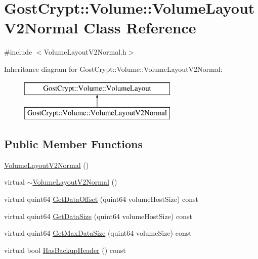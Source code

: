 \hypertarget{class_gost_crypt_1_1_volume_1_1_volume_layout_v2_normal}{}\section{Gost\+Crypt\+:\+:Volume\+:\+:Volume\+Layout\+V2\+Normal Class Reference}
\label{class_gost_crypt_1_1_volume_1_1_volume_layout_v2_normal}


{\ttfamily \#include $<$Volume\+Layout\+V2\+Normal.\+h$>$}

Inheritance diagram for Gost\+Crypt\+:\+:Volume\+:\+:Volume\+Layout\+V2\+Normal\+:\begin{figure}[H]
\begin{center}
\leavevmode
\includegraphics[height=2.000000cm]{class_gost_crypt_1_1_volume_1_1_volume_layout_v2_normal}
\end{center}
\end{figure}
\subsection*{Public Member Functions}
\begin{DoxyCompactItemize}
\item 
\hyperlink{class_gost_crypt_1_1_volume_1_1_volume_layout_v2_normal_ae911f4c1240cd58d9363f9c924276165}{Volume\+Layout\+V2\+Normal} ()
\item 
virtual \hyperlink{class_gost_crypt_1_1_volume_1_1_volume_layout_v2_normal_add4080e9a1a72b3dd6d39c91f44eb20d}{$\sim$\+Volume\+Layout\+V2\+Normal} ()
\item 
virtual quint64 \hyperlink{class_gost_crypt_1_1_volume_1_1_volume_layout_v2_normal_a6529ff8777f6e31f412dee79102d11b5}{Get\+Data\+Offset} (quint64 volume\+Host\+Size) const
\item 
virtual quint64 \hyperlink{class_gost_crypt_1_1_volume_1_1_volume_layout_v2_normal_a936a198ca9967611d4d40cc97474c310}{Get\+Data\+Size} (quint64 volume\+Host\+Size) const
\item 
virtual quint64 \hyperlink{class_gost_crypt_1_1_volume_1_1_volume_layout_v2_normal_a6514185db235a650e86fc25ef7daa10c}{Get\+Max\+Data\+Size} (quint64 volume\+Size) const
\item 
virtual bool \hyperlink{class_gost_crypt_1_1_volume_1_1_volume_layout_v2_normal_a18a75c3663f6922e890dca6825c0b580}{Has\+Backup\+Header} () const
\end{DoxyCompactItemize}
